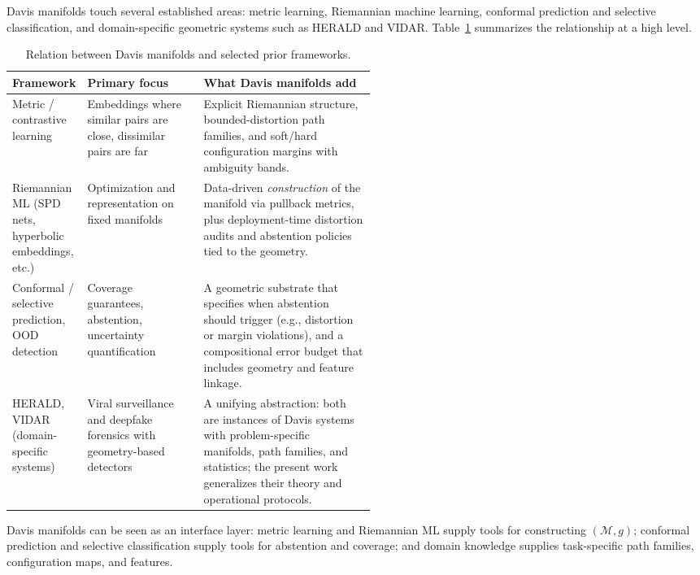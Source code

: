 \documentclass[11pt]{article}
\theoremstyle{remark}
\theoremstyle{plain}
\begin{document}
Davis manifolds touch several established areas: metric learning, Riemannian machine learning,
conformal prediction and selective classification, and domain-specific geometric systems such as
HERALD and VIDAR. Table~\ref{tab:relation-prior-work} summarizes the relationship at a high
level.

\begin{table}[H]
  \centering
  \begin{tabularx}{\linewidth}{@{}p{0.20\linewidth}p{0.32\linewidth}X@{}}
    \toprule
    \textbf{Framework} & \textbf{Primary focus} & \textbf{What Davis manifolds add} \\
    \midrule
    Metric / contrastive learning &
    Embeddings where similar pairs are close, dissimilar pairs are far &
    Explicit Riemannian structure, bounded-distortion path families, and soft/hard configuration margins with ambiguity bands. \\
    \addlinespace
    Riemannian ML (SPD nets, hyperbolic embeddings, etc.) &
    Optimization and representation on fixed manifolds &
    Data-driven \emph{construction} of the manifold via pullback metrics, plus deployment-time distortion audits and abstention policies tied to the geometry. \\
    \addlinespace
    Conformal / selective prediction, OOD detection &
    Coverage guarantees, abstention, uncertainty quantification &
    A geometric substrate that specifies when abstention should trigger (e.g., distortion or margin violations), and a compositional error budget that includes geometry and feature linkage. \\
    \addlinespace
    HERALD, VIDAR (domain-specific systems) &
    Viral surveillance and deepfake forensics with geometry-based detectors &
    A unifying abstraction: both are instances of Davis systems with problem-specific manifolds, path families, and statistics; the present work generalizes their theory and operational protocols. \\
    \bottomrule
  \end{tabularx}
  \caption{Relation between Davis manifolds and selected prior frameworks.}
  \label{tab:relation-prior-work}
\end{table}

Davis manifolds can be seen as an interface layer: metric learning and Riemannian ML supply
tools for constructing $(\mathcal{M},g)$; conformal prediction and selective classification supply tools
for abstention and coverage; and domain knowledge supplies task-specific path families, configuration
maps, and features.
\end{document}
